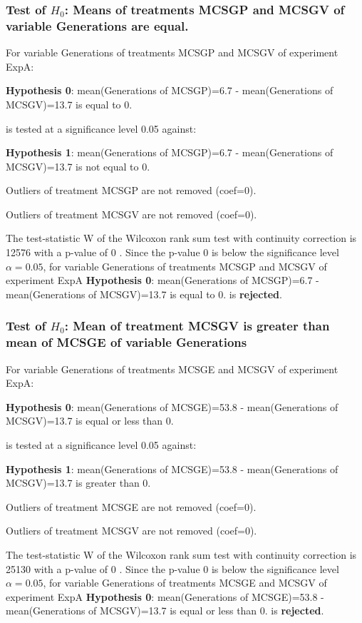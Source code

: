 \documentclass[18pt,c]{beamer}
\begin{document}
\begin{frame}[t]
 \frametitle{Test of $H_{0}$: Means of treatments MCSGP and MCSGV of variable Generations are equal. }
 \scriptsize
 For variable Generations of treatments MCSGP and MCSGV of experiment ExpA:

\vspace{1mm}
{\bf Hypothesis 0}: mean(Generations of MCSGP)=6.7 - mean(Generations of MCSGV)=13.7 is equal to 0.


 \begin{center} is tested at a significance level 0.05 against: \end{center}

{\bf Hypothesis 1}: mean(Generations of MCSGP)=6.7 - mean(Generations of MCSGV)=13.7 is not equal to 0.
\vspace{1mm}
\vspace{1mm}

 Outliers of treatment MCSGP  are not removed (coef=0).

 Outliers of treatment MCSGV  are not removed (coef=0).
\vspace{1mm}
 
 The test-statistic W of the Wilcoxon rank sum test with continuity correction is 12576 with a p-value of 0 .
 Since the p-value 0 is below the significance level $\alpha= 0.05 $,
 for variable Generations of treatments MCSGP and MCSGV of experiment ExpA 
 {\bf Hypothesis 0}: mean(Generations of MCSGP)=6.7 - mean(Generations of MCSGV)=13.7 is equal to 0.
is {\bf rejected}.

 \end{frame}
\begin{frame}[t]
 \frametitle{Test of $H_{0}$: Mean of treatment MCSGV is greater than mean of MCSGE of variable Generations }
 \scriptsize
 For variable Generations of treatments MCSGE and MCSGV of experiment ExpA:

\vspace{1mm}
{\bf Hypothesis 0}: mean(Generations of MCSGE)=53.8 - mean(Generations of MCSGV)=13.7 is equal or less than 0.


 \begin{center} is tested at a significance level 0.05 against: \end{center}

{\bf Hypothesis 1}: mean(Generations of MCSGE)=53.8 - mean(Generations of MCSGV)=13.7 is greater than 0.
\vspace{1mm}
\vspace{1mm}

 Outliers of treatment MCSGE  are not removed (coef=0).

 Outliers of treatment MCSGV  are not removed (coef=0).
\vspace{1mm}
 
 The test-statistic W of the Wilcoxon rank sum test with continuity correction is 25130 with a p-value of 0 .
 Since the p-value 0 is below the significance level $\alpha= 0.05 $,
 for variable Generations of treatments MCSGE and MCSGV of experiment ExpA 
 {\bf Hypothesis 0}: mean(Generations of MCSGE)=53.8 - mean(Generations of MCSGV)=13.7 is equal or less than 0.
is {\bf rejected}.

 \end{frame}
\end{document}
